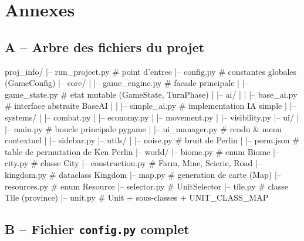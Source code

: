 \documentclass[12pt, a4paper]{article}
\begin{document}
\newpage

\printbibliography

\newpage

\section*{Annexes}

\subsection*{A – Arbre des fichiers du projet}

\begin{myverbatim}
proj_info/
|-- run_project.py          # point d'entree
|-- config.py               # constantes globales (GameConfig)
|-- core/
|   |-- game_engine.py      # facade principale
|   |-- game_state.py       # etat mutable (GameState, TurnPhase)
|   |-- ai/
|   |   |-- base_ai.py      # interface abstraite BaseAI
|   |   |-- simple_ai.py    # implementation IA simple
|   |-- systems/
|       |-- combat.py
|       |-- economy.py
|       |-- movement.py
|       |-- visibility.py
|-- ui/
|   |-- main.py             # boucle principale pygame
|   |-- ui_manager.py       # rendu & menu contextuel
|   |-- sidebar.py
|-- utils/
|   |-- noise.py            # bruit de Perlin
|   |-- perm.json           # table de permutation de Ken Perlin
|-- world/
    |-- biome.py            # enum Biome
    |-- city.py             # classe City
    |-- construction.py     # Farm, Mine, Scierie, Road
    |-- kingdom.py          # dataclass Kingdom
    |-- map.py              # generation de carte (Map)
    |-- resources.py        # enum Resource
    |-- selector.py         # UnitSelector
    |-- tile.py             # classe Tile (province)
    |-- unit.py             # Unit + sous-classes + UNIT_CLASS_MAP
\end{myverbatim}

\subsection*{B – Fichier \texttt{config.py} complet}
\end{document}
